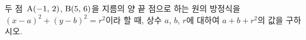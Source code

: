 두 점~$\mathrm{A}(-1,\,2)$, $\mathrm{B}(5,\,6)$을 지름의 양 끝 점으로 하는 원의 방정식을 $(x-a)^2+(y-b)^2=r^2$이라 할 때, 상수 $a$, $b$, $r$에 대하여 $a+b+r^2$의 값을 구하시오.
